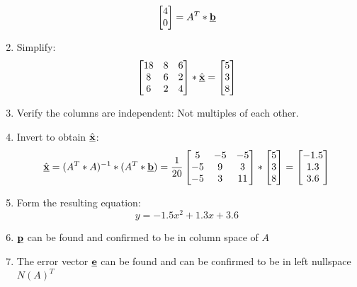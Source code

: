 \documentclass[10pt,a4paper]{article}
\begin{document}
\begin{enumerate}
$$\begin{bmatrix}
		4\\
		0
	\end{bmatrix}=A^T*\textbf{\underbar{b}}$$
	\item Simplify:
	$$\begin{bmatrix}
		18&8&6\\
		8&6&2\\
		6&2&4
	\end{bmatrix}*\hat{\textbf{\underbar{x}}} = \begin{bmatrix}
		5\\
		3\\
		8
	\end{bmatrix}$$
	\item Verify the columns are independent: Not multiples of each other.
	\item Invert to obtain $\hat{\textbf{\underbar{x}}}$:
	$$\hat{\textbf{\underbar{x}}}=(A^T*A)^{-1}*(A^T*\textbf{\underbar{b}})=\frac{1}{20}
	\begin{bmatrix}
		5&-5&-5\\
		-5&9&3\\
		-5&3&11
	\end{bmatrix}*
	\begin{bmatrix}
		5\\
		3\\
		8
	\end{bmatrix}=
	\begin{bmatrix}
		-1.5\\
		1.3\\
		3.6
	\end{bmatrix}$$
	\item Form the resulting equation:
	$$y=-1.5x^2+1.3x+3.6$$
	\item $\textbf{\underbar{p}}$ can be found and confirmed to be in column space of $A$
	\item The error vector $\textbf{\underbar{e}}$ can be found and can be confirmed to be in left
	nullspace $N(A)^T$
\end{enumerate}

\end{document}
